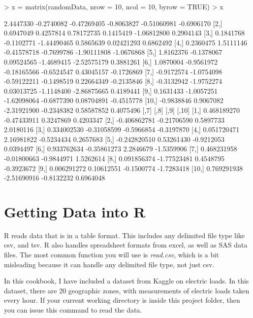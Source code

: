 \documentclass{article}
\begin{document}
\begin{Schunk}
\begin{Sinput}
> x = matrix(randomData, nrow = 10, ncol = 10, byrow = TRUE)
> x
\end{Sinput}
\begin{Soutput}
            [,1]       [,2]        [,3]       [,4]        [,5]       [,6]
 [1,]  2.4447330 -0.2740082 -0.47269405 -0.8063827 -0.51060981 -0.6906170
 [2,]  0.6947049  0.4257814  0.78172735  0.1415419 -1.06812800  0.2904143
 [3,]  0.1841768 -0.1102771 -1.44490465  0.5865639  0.02421293  0.6862492
 [4,]  0.2360475  1.5111146 -0.41578718 -0.7699786 -1.90111808 -1.0676868
 [5,]  1.8162376 -0.1378067  0.09524565 -1.4689415 -2.52575179  0.3881261
 [6,]  1.0870004 -0.9561972 -0.18165566 -0.6524547  0.43045157 -0.1726869
 [7,] -0.9172574 -1.0754098 -0.59122211 -0.1498519  0.22664349 -0.2135846
 [8,] -0.3132942 -1.9752274  0.03013725 -1.1148400 -2.86875665  0.4189441
 [9,]  0.1631433 -1.0057251 -1.62098064 -0.6877390  0.08704891 -0.4515778
[10,] -0.9838846  0.9067082 -2.31921900 -0.2348382  0.58587852  0.4075496
              [,7]        [,8]       [,9]      [,10]
 [1,]  0.468189270 -0.47433911  0.3247869  0.4203347
 [2,] -0.406862781 -0.21706590  0.5897733  2.0180116
 [3,]  0.334002530 -0.31058599 -0.5966854 -0.3197870
 [4,]  0.051720471  2.16981822 -0.5234434  0.2657683
 [5,] -0.242820510  0.53261430 -0.9212053  0.0394497
 [6,]  0.933762634 -0.35861273  2.2846679 -1.5359906
 [7,]  0.468231958 -0.01800663 -0.9844971  1.5262614
 [8,]  0.091856374 -1.77523481  0.4548795 -0.3923672
 [9,]  0.006291272  0.10612551 -0.1500774 -1.7283418
[10,]  0.769291938 -2.51690916 -0.8132232  0.6964048
\end{Soutput}
\end{Schunk}

\section{Getting Data into R}

R reads data that is in a table format.  This includes any delimited file type like
csv, and tsv.  R also handles spreadsheet formats from excel, as well as SAS data files.
The most common function you will use is \textit{read.csv}, which is a bit misleading
because it can handle any delimited file type, not just csv.

In this cookbook, I have included a dataset from Kaggle on electric loads.  In
this dataset, there are 20 geographic zones, with measurements of electric loads
taken every hour.  If your current working directory is inside this project folder,
then you can issue this command to read the data.
\end{document}
